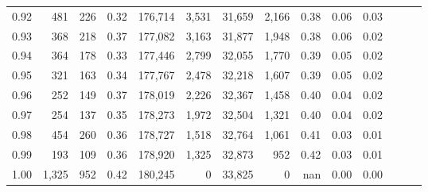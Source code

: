 \begin{tabular}{rrrrrrrrrrrrrr}
0.92 &    481 &  226 &  0.32 &  176,714 &    3,531 &  31,659 &   2,166 &  0.38 &  0.06 &      0.03 \\
0.93 &    368 &  218 &  0.37 &  177,082 &    3,163 &  31,877 &   1,948 &  0.38 &  0.06 &      0.02 \\
0.94 &    364 &  178 &  0.33 &  177,446 &    2,799 &  32,055 &   1,770 &  0.39 &  0.05 &      0.02 \\
0.95 &    321 &  163 &  0.34 &  177,767 &    2,478 &  32,218 &   1,607 &  0.39 &  0.05 &      0.02 \\
0.96 &    252 &  149 &  0.37 &  178,019 &    2,226 &  32,367 &   1,458 &  0.40 &  0.04 &      0.02 \\
0.97 &    254 &  137 &  0.35 &  178,273 &    1,972 &  32,504 &   1,321 &  0.40 &  0.04 &      0.02 \\
0.98 &    454 &  260 &  0.36 &  178,727 &    1,518 &  32,764 &   1,061 &  0.41 &  0.03 &      0.01 \\
0.99 &    193 &  109 &  0.36 &  178,920 &    1,325 &  32,873 &     952 &  0.42 &  0.03 &      0.01 \\
1.00 &  1,325 &  952 &  0.42 &  180,245 &        0 &  33,825 &       0 &   nan &  0.00 &      0.00 \\
\bottomrule
\end{tabular}
